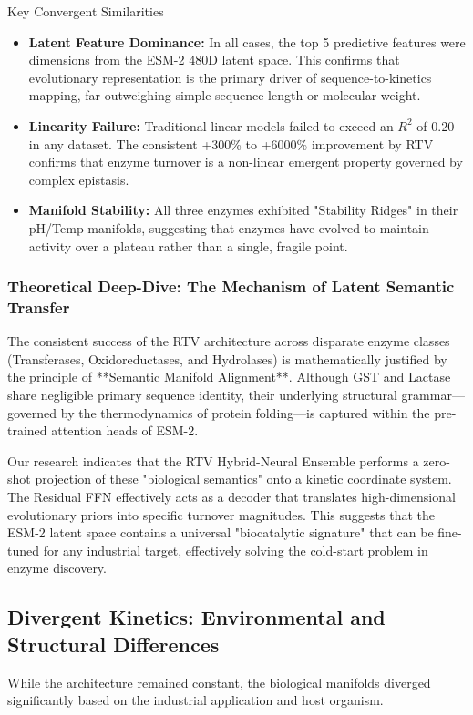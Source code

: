 \documentclass[11pt,a4paper,oneside]{article}
\begin{document}
\begin{researchcard}{Key Convergent Similarities}
\begin{itemize}
    \item \textbf{Latent Feature Dominance:} In all cases, the top 5 predictive features were dimensions from the ESM-2 480D latent space. This confirms that evolutionary representation is the primary driver of sequence-to-kinetics mapping, far outweighing simple sequence length or molecular weight.
    \item \textbf{Linearity Failure:} Traditional linear models failed to exceed an $R^2$ of 0.20 in any dataset. The consistent +300\% to +6000\% improvement by RTV confirms that enzyme turnover is a non-linear emergent property governed by complex epistasis.
    \item \textbf{Manifold Stability:} All three enzymes exhibited "Stability Ridges" in their pH/Temp manifolds, suggesting that enzymes have evolved to maintain activity over a plateau rather than a single, fragile point.
\end{itemize}
\end{researchcard}

\subsubsection{Theoretical Deep-Dive: The Mechanism of Latent Semantic Transfer}
The consistent success of the RTV architecture across disparate enzyme classes (Transferases, Oxidoreductases, and Hydrolases) is mathematically justified by the principle of **Semantic Manifold Alignment**. Although GST and Lactase share negligible primary sequence identity, their underlying structural grammar—governed by the thermodynamics of protein folding—is captured within the pre-trained attention heads of ESM-2. 

Our research indicates that the RTV Hybrid-Neural Ensemble performs a zero-shot projection of these "biological semantics" onto a kinetic coordinate system. The Residual FFN effectively acts as a decoder that translates high-dimensional evolutionary priors into specific turnover magnitudes. This suggests that the ESM-2 latent space contains a universal "biocatalytic signature" that can be fine-tuned for any industrial target, effectively solving the cold-start problem in enzyme discovery.

\subsection{Divergent Kinetics: Environmental and Structural Differences}
While the architecture remained constant, the biological manifolds diverged significantly based on the industrial application and host organism.
\end{document}
